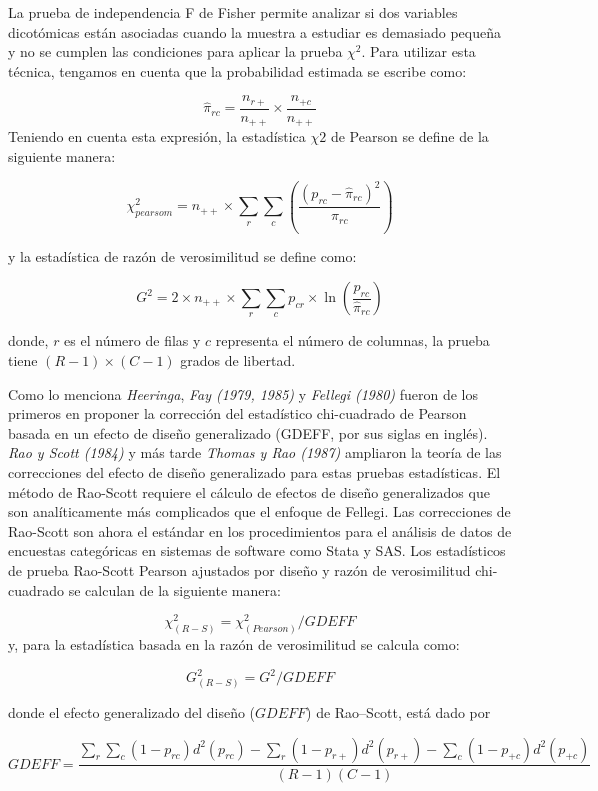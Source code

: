 \documentclass[
  12pt,
]{book}
\begin{document}
La prueba de independencia F de Fisher permite analizar si dos variables dicotómicas están asociadas cuando la muestra a estudiar es demasiado pequeña y no se cumplen las condiciones para aplicar la prueba \(\chi^{2}\). Para utilizar esta técnica, tengamos en cuenta que la probabilidad estimada se escribe como:

\[
\hat{\pi}_{rc}=\frac{n_{r+}}{n_{++}}\times\frac{n_{+c}}{n_{++}}
\]
Teniendo en cuenta esta expresión, la estadística \(\chi{2}\) de Pearson se define de la siguiente manera:

\[
\chi_{pearsom}^{2}=n_{++}\times\sum_{r}\sum_{c}\left(\frac{\left(p_{rc}-\hat{\pi}_{rc}\right)^{2}}{\hat{\pi}_{rc}}\right)
\]

y la estadística de razón de verosimilitud se define como:

\[
G^{2}=2\times n_{++}\times\sum_{r}\sum_{c}p_{cr}\times\ln\left(\frac{p_{rc}}{\hat{\pi}_{rc}}\right)
\]

donde, \(r\) es el número de filas y \(c\) representa el número de columnas, la prueba tiene \((R-1)\times (C-1)\) grados de libertad.

Como lo menciona \emph{Heeringa}, \emph{Fay (1979, 1985)} y \emph{Fellegi (1980)} fueron de los primeros en proponer la corrección del estadístico chi-cuadrado de Pearson basada en un efecto de diseño generalizado (GDEFF, por sus siglas en inglés). \emph{Rao y Scott (1984)} y más tarde \emph{Thomas y Rao (1987)} ampliaron la teoría de las correcciones del efecto de diseño generalizado para estas pruebas estadísticas. El método de Rao-Scott requiere el cálculo de efectos de diseño generalizados que son analíticamente más complicados que el enfoque de Fellegi. Las correcciones de Rao-Scott son ahora el estándar en los procedimientos para el análisis de datos de encuestas categóricas en sistemas de software como Stata y SAS. Los estadísticos de prueba Rao-Scott Pearson ajustados por diseño y razón de verosimilitud chi-cuadrado se calculan de la siguiente manera:

\[
\chi^2_{(R-S)} = \chi^2_{(Pearson)}\big/GDEFF
\]
y, para la estadística basada en la razón de verosimilitud se calcula como:

\[
G^2_{(R-S)}  =  G^2\big/GDEFF
\]

donde el efecto generalizado del diseño (\(GDEFF\)) de Rao--Scott, está dado por

\[
GDEFF=\frac{\sum_{r}\sum_{c}\left(1-p_{rc}\right)d^{2}\left(p_{rc}\right)-\sum_{r}\left(1-p_{r+}\right)d^{2}\left(p_{r+}\right)-\sum_{c}\left(1-p_{+c}\right)d^{2}\left(p_{+c}\right)}{\left(R-1\right)\left(C-1\right)}
\]
\end{document}
